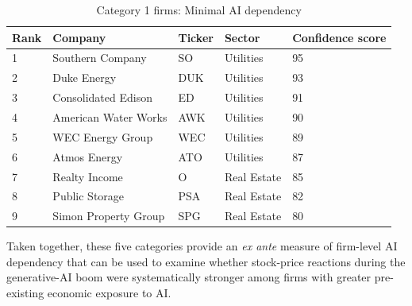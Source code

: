 \documentclass{article}
\begin{document}
\begin{table}[H]
\centering
\caption{Category 1 firms: Minimal AI dependency}
\small
\renewcommand{\arraystretch}{1.15}
\begin{tabularx}{\textwidth}{@{} C{1.1cm} L{4.2cm} C{1.6cm} L{4.3cm} C{2.3cm} @{}}
\toprule
\textbf{Rank} & \textbf{Company} & \textbf{Ticker} & \textbf{Sector} & \textbf{Confidence score} \\
 & Southern Company & SO & Utilities & 95 \\
2 & Duke Energy & DUK & Utilities & 93 \\
3 & Consolidated Edison & ED & Utilities & 91 \\
4 & American Water Works & AWK & Utilities & 90 \\
5 & WEC Energy Group & WEC & Utilities & 89 \\
6 & Atmos Energy & ATO & Utilities & 87 \\
7 & Realty Income & O & Real Estate & 85 \\
8 & Public Storage & PSA & Real Estate & 82 \\
9 & Simon Property Group & SPG & Real Estate & 80 \\
\bottomrule
\end{tabularx}
\label{tab:category1}
\end{table}

Taken together, these five categories provide an \textit{ex ante} measure of firm-level AI dependency that can be used to examine whether stock-price reactions during the generative-AI boom were systematically stronger among firms with greater pre-existing economic exposure to AI.
\end{document}
